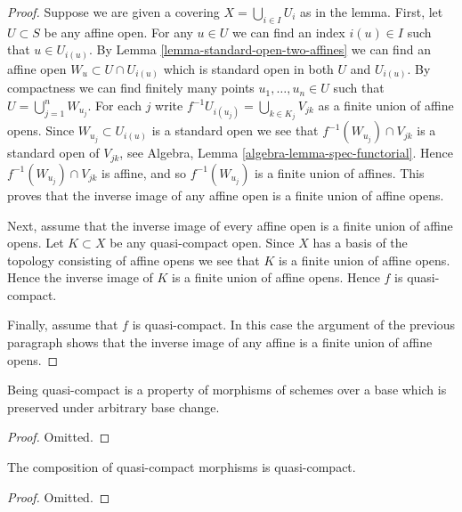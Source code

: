 \begin{proof}
Suppose we are given a covering $X = \bigcup_{i \in I} U_i$ as in the lemma.
First, let $U \subset S$ be any affine open. For any $u \in U$
we can find an index $i(u) \in I$ such that $u \in U_{i(u)}$.
By Lemma \ref{lemma-standard-open-two-affines} we can find
an affine open $W_u \subset U \cap U_{i(u)}$
which is standard open in both $U$ and $U_{i(u)}$.
By compactness we can find finitely many points $u_1, \ldots, u_n \in U$
such that $U = \bigcup_{j = 1}^n W_{u_j}$. For each $j$ write
$f^{-1}U_{i(u_j)} = \bigcup_{k \in K_j} V_{jk}$ as a finite
union of affine opens. Since $W_{u_j} \subset U_{i(u)}$ is a standard
open we see that $f^{-1}(W_{u_j}) \cap V_{jk}$ is a standard
open of $V_{jk}$, see Algebra, Lemma \ref{algebra-lemma-spec-functorial}.
Hence $f^{-1}(W_{u_j}) \cap V_{jk}$ is affine, and so
$f^{-1}(W_{u_j})$ is a finite union of affines. This proves that the
inverse image of any affine open is a finite union of affine opens.

\medskip\noindent
Next, assume that the inverse image of every affine open is a finite
union of affine opens.
Let $K \subset X$ be any quasi-compact open. Since $X$ has a basis
of the topology consisting of affine opens we see that $K$ is a finite
union of affine opens. Hence the inverse image of $K$ is a finite
union of affine opens. Hence $f$ is quasi-compact.

\medskip\noindent
Finally, assume that $f$ is quasi-compact. In this case the argument
of the previous paragraph shows that the inverse image of any affine
is a finite union of affine opens.
\end{proof}

\begin{lemma}
\label{lemma-quasi-compact-preserved-base-change}
Being quasi-compact is a property of morphisms of schemes
over a base which is preserved under arbitrary base change.
\end{lemma}

\begin{proof}
Omitted.
\end{proof}

\begin{lemma}
\label{lemma-composition-quasi-compact}
The composition of quasi-compact morphisms is quasi-compact.
\end{lemma}

\begin{proof}
Omitted.
\end{proof}

